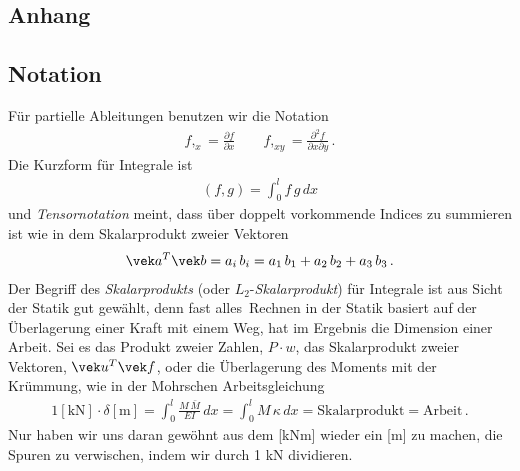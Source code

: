 \setcounter{chapter}{6}
\textcolor{blau2}{\chapter{Anhang}}\label{Details}
\vspace{-3cm}
{\textcolor{hellgrau2}{\section{Notation}}}
F\"{u}r partielle Ableitungen benutzen wir die Notation
\begin{align}
f,_x = \frac{\partial f}{\partial x} \qquad f,_{xy} = \frac{\partial^2 f}{\partial x \partial y}\,.
\end{align}
Die Kurzform f\"{u}r Integrale ist
\begin{align}
(f,g) = \int_{0}^{l} f\,g\,dx
\end{align}
und {\em Tensornotation\/} meint, dass \"{u}ber doppelt vorkommende Indices zu summieren ist wie in dem Skalarprodukt zweier Vektoren
\begin{align}
\vek a^T \vek b = a_i\,b_i = a_1\,b_1 + a_2\,b_2 + a_3\,b_3\,.
\end{align}
Der Begriff des {\em Skalarprodukts\/} (oder $L_2$-{\em Skalarprodukt\/}) f\"{u}r Integrale ist aus Sicht der Statik gut gew\"{a}hlt, denn \glq fast alles\grq\ Rechnen in der Statik basiert auf der \"{U}berlagerung einer Kraft mit einem Weg, hat im Ergebnis die Dimension einer Arbeit. Sei es  das Produkt zweier Zahlen, $P \cdot w$, das Skalarprodukt zweier Vektoren, $\vek u^T \vek f$, oder die \"{U}berlagerung des Moments mit der Kr\"{u}mmung, wie in der Mohrschen Arbeitsgleichung
\begin{align}
1 [\text{kN}] \cdot \delta [\text{m}]= \int_{0}^{l}\frac{M\,\bar{M}}{EI}\,dx = \int_{0}^{l} M\,\kappa\,dx = \text{Skalarprodukt} = \text{Arbeit}\,.
\end{align}
Nur haben wir uns daran gew\"{o}hnt aus dem [kNm] wieder ein [m] zu machen, die Spuren zu verwischen, indem wir durch 1 kN dividieren.

